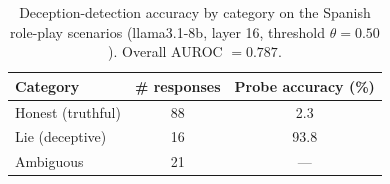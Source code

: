 \begin{table}[t]
\centering
\caption{Deception-detection accuracy by category on the Spanish role-play scenarios (llama3.1-8b, layer 16, threshold $\theta=0.50$). Overall AUROC $= 0.787$.}
\label{tab:scenarios}
\begin{tabular}{lcc}
\toprule
Category & \# responses & Probe accuracy (\%)\\
\midrule
Honest (truthful) & 88 & 2.3\\
Lie (deceptive) & 16 & 93.8\\
Ambiguous & 21 & --- \\
\bottomrule
\end{tabular}
\end{table}
